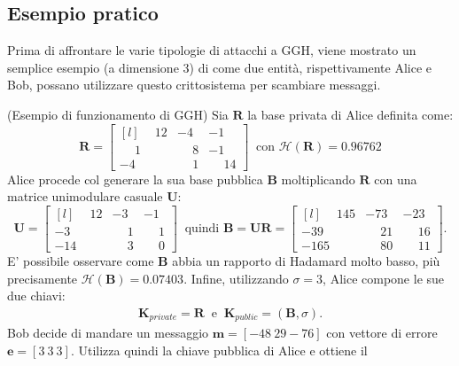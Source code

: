 \subsection{Esempio pratico}
\label{exp:GGH}
Prima di affrontare le varie tipologie di attacchi a GGH, viene mostrato un semplice esempio
(a dimensione 3) di come due entità, rispettivamente Alice e Bob, possano utilizzare questo
crittosistema per scambiare messaggi.
\begin{exmp} (Esempio di funzionamento di GGH)
Sia $\mathbf{R}$ la base privata di Alice definita come:
\begin{equation*}
    \mathbf{R} =
    \begin{bmatrix*}[l]
        \phantom{-}12 & -4 & -1\\
        \phantom{-}1 & \phantom{-}8 & -1\\
        -4 & \phantom{-}1 & \phantom{-}14
    \end{bmatrix*}
    \ \text{ con } \mathcal{H}(\mathbf{R}) = 0.96762
\end{equation*}
Alice procede col generare la sua base pubblica $\mathbf{B}$ moltiplicando $\mathbf{R}$ con una matrice
unimodulare casuale $\mathbf{U}$:
\begin{equation*}
    \mathbf{U} =
    \begin{bmatrix*}[l]
        \phantom{-}12 & -3 & -1\\
        -3 & \phantom{-}1 & \phantom{-}1\\
        -14 & \phantom{-}3 & \phantom{-}0
    \end{bmatrix*}
    \ \text{ quindi } \mathbf{B}=\mathbf{U}\mathbf{R} =
    \begin{bmatrix*}[l]
        \phantom{-}145 & -73 & -23\\
        -39  & \phantom{-}21 & \phantom{-}16\\
        -165  & \phantom{-}80 & \phantom{-}11
    \end{bmatrix*}.
\end{equation*}
E' possibile osservare come $\mathbf{B}$ abbia un rapporto di Hadamard molto basso, più 
precisamente $\mathcal{H}(\mathbf{B}) = 0.07403$. Infine, utilizzando $\sigma = 3$, 
Alice compone le sue due chiavi:
\begin{gather*}
    \mathbf{K}_{private} = \mathbf{R}
    \ \text{ e } \  
    \mathbf{K}_{public} = (\mathbf{B}, \sigma).
\end{gather*}
Bob decide di mandare un messaggio $\mathbf{m} = [-48 \ 29 -76]$ con vettore di errore
$\mathbf{e} = [3 \ 3 \ 3]$. Utilizza quindi la chiave pubblica di Alice e ottiene il 

\end{exmp}
